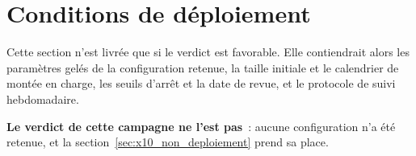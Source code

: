 \section{Conditions de déploiement}
\label{sec:x10_deploiement}

Cette section n'est livrée que si le verdict est favorable. Elle contiendrait
alors les paramètres gelés de la configuration retenue, la taille initiale et
le calendrier de montée en charge, les seuils d'arrêt et la date de revue, et
le protocole de suivi hebdomadaire.

\textbf{Le verdict de cette campagne ne l'est pas}~: aucune configuration n'a
été retenue, et la section~\ref{sec:x10_non_deploiement} prend sa place.
